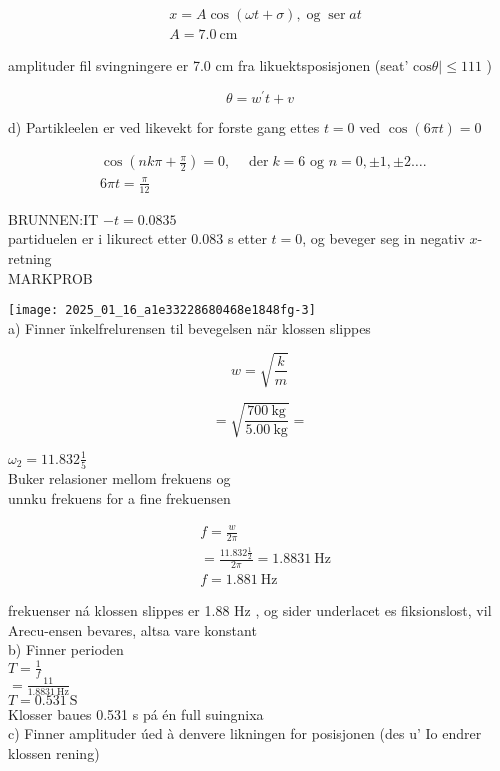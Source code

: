 \documentclass[10pt]{article}
\begin{document}
$$
\begin{aligned}
& x=A \cos (\omega t+\sigma), \operatorname{og} \operatorname{ser} a t \\
& A=7.0 \mathrm{~cm}
\end{aligned}
$$

amplituder fil svingningere er 7.0 cm fra likuektsposisjonen (seat' $\mathrm{cos} \theta \mid \leq 111$ )

$$
\theta=w^{\prime} t+v
$$

d) Partikleelen er ved likevekt for forste gang ettes $t=0$ ved $\cos (6 \pi t)=0$

$$
\begin{aligned}
& \cos \left(n k \pi+\frac{\pi}{2}\right)=0, \quad \operatorname{der} k=6 \text { og } n=0, \pm 1, \pm 2 \ldots \text {. } \\
& 6 \pi t=\frac{\pi}{12}
\end{aligned}
$$

BRUNNEN:IT $-t=0.0835$\\
partiduelen er i likurect etter 0.083 s etter $t=0$, og beveger seg in negativ $x$-retning\\

MARKPROB

\texttt{[image: 2025\_01\_16\_a1e33228680468e1848fg-3]}\\
a) Finner ïnkelfrelurensen til bevegelsen när klossen slippes

$$
w=\sqrt{\frac{k}{m}}
$$

$$
=\sqrt{\frac{700 \mathrm{~kg}}{5.00 \mathrm{~kg}}}=
$$

$\omega_{2}=11.832 \frac{1}{5}$\\
Buker relasioner mellom frekuens og\\
unnku frekuens for a fine frekuensen

$$
\begin{aligned}
& f=\frac{w}{2 \pi} \\
&=\frac{11.832 \frac{1}{2}}{2 \pi}=1.8831 \mathrm{~Hz} \\
& f=1.881 \mathrm{~Hz}
\end{aligned}
$$

frekuenser ná klossen slippes er 1.88 Hz , og sider underlacet es fiksionslost, vil Arecu-ensen bevares, altsa vare konstant\\
b) Finner perioden\\
$T=\frac{1}{f}$\\
$=\frac{11}{1.8831 \mathrm{~Hz}}$\\
$T=0.531 \mathrm{~S}$\\
Klosser baues 0.531 s pá én full suingnixa\\
c) Finner amplituder úed à denvere likningen for posisjonen (des u' Io endrer klossen rening)
\end{document}
